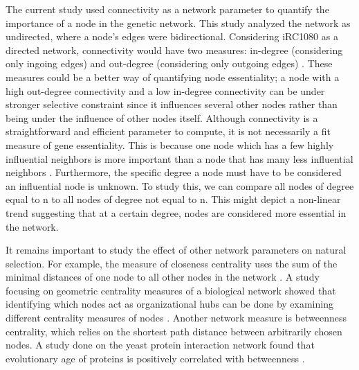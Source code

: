 \documentclass[letterpaper, 10 pt, conference]{ieeeconf}  %
\begin{document}
\setlength{\parindent}{10ex}
The current study used connectivity as a network parameter to quantify the importance of a node in the genetic network. This study analyzed the network as undirected, where a node's edges were bidirectional. Considering iRC1080 as a directed network, connectivity would have two measures: in-degree (considering only ingoing edges) and out-degree (considering only outgoing edges) \cite{ks08}. These measures could be a better way of quantifying node essentiality; a node with a high out-degree connectivity and a low in-degree connectivity can be under stronger selective constraint since it influences several other nodes rather than being under the influence of other nodes itself. 
Although connectivity is a straightforward and efficient parameter to compute, it is not necessarily a fit measure of gene essentiality. This is because one node which has a few highly influential neighbors is more important than a node that has many less influential neighbors \cite{clszz12}. Furthermore, the specific degree a node must have to be considered an influential node is unknown. To study this, we can compare all nodes of degree equal to n to all nodes of degree not equal to n. This might depict a non-linear trend suggesting that at a certain degree, nodes are considered more essential in the network. 

It remains important to study the effect of other network parameters on natural selection. For example, the measure of  closeness centrality uses the sum of the minimal distances of one node to all other nodes in the network \cite{ks08}. A study focusing on geometric centrality measures of a biological network showed that identifying which nodes act as organizational hubs can be done by examining different centrality measures of nodes \cite{ws03}. Another network measure is betweenness centrality, which relies on the shortest path distance between arbitrarily chosen nodes. A study done on the yeast protein interaction network found that evolutionary age of proteins is positively correlated with betweenness \cite{jbih05}. 
\end{document}
